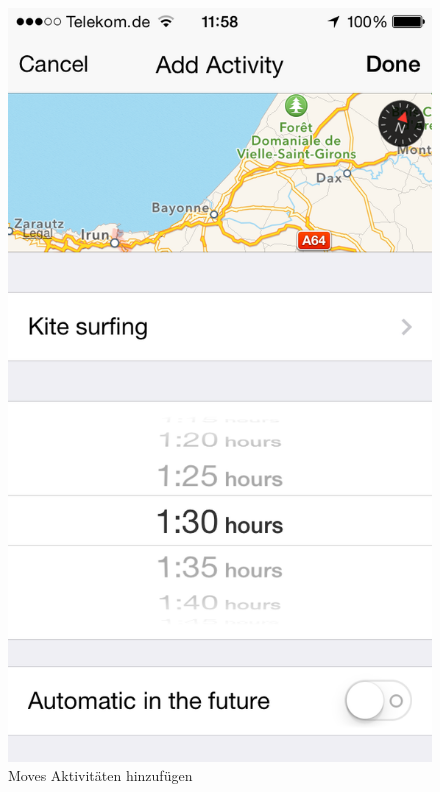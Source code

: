 \begin{figure}[]
  \centering
  \begin{minipage}[t]{0.47\textwidth}
    \centering
    \includegraphics[scale=0.3]{images/moves-app-add-activity.png} 
    \caption{Moves Aktivitäten hinzufügen \cite{fig:SportActivity}}
    \label{fig:SportActivity}
  \end{minipage}
  \begin{minipage}[t]{0.47\textwidth}
    \centering

\end{minipage}
\end{figure}
